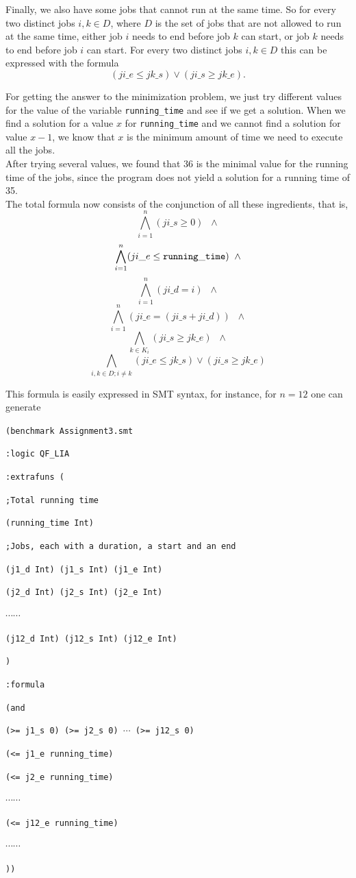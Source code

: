 \documentclass[a4paper]{article}
\begin{document}
	Finally, we also have some jobs that cannot run at the same time. So for every two distinct jobs $i,k \in D$, where $D$ is the set of jobs that are not allowed to run at the same time, either job $i$ needs to end before job $k$ can start, or job $k$ needs to end before job $i$ can start. For every two distinct jobs $i,k \in D$ this can be expressed with the formula
\[ (ji\_e \leq jk\_s) \vee (ji\_s \geq jk\_e).\]
	
For getting the answer to the minimization problem, we just try different values for the value of the variable {\tt running\_time} and see if we get a solution. When we find a solution for a value $x$ for {\tt running\_time} and we cannot find a solution for value $x-1$, we know that $x$ is the minimum amount of time we need to execute all the jobs.\\

After trying several values, we found that 36 is the minimal value for the running time of the jobs, since the program does not yield a solution for a running time of 35.\\

The total formula now consists of the conjunction of all these ingredients, that is,
\[ \bigwedge_{i=1}^n (ji\_s \geq 0) \;\; \wedge \]
\[ \bigwedge_{i=1}^n (ji\_e \leq {\tt running\_time}) \;\; \wedge \]
\[ \bigwedge_{i=1}^n (ji\_d = i) \;\; \wedge \]
\[ \bigwedge_{i=1}^n (ji\_e = (ji\_s + ji\_d)) \;\; \wedge \]
\[ \bigwedge_{k \in K_i} (ji\_s \geq jk\_e) \;\; \wedge \]
\[ \bigwedge_{i,k \in D; i \neq k} (ji\_e \leq jk\_s) \vee (ji\_s \geq jk\_e) \]


This formula is easily expressed in SMT syntax, for instance, for $n=12$ one can generate

{\footnotesize

{\tt (benchmark Assignment3.smt}

{\tt :logic QF\_LIA}

{\tt :extrafuns (}

{\tt ;Total running time }

{\tt (running\_time Int) }

{\tt ;Jobs, each with a duration, a start and an end }

{\tt (j1\_d Int) (j1\_s Int) (j1\_e Int) }
 
{\tt (j2\_d Int) (j2\_s Int) (j2\_e Int) }
 
$\cdots \cdots$
 
{\tt (j12\_d Int) (j12\_s Int) (j12\_e Int) }

{\tt )}

{\tt :formula}

{\tt   (and}

{\tt (>= j1\_s 0) (>= j2\_s 0) $\cdots$ (>= j12\_s 0) }

{\tt (<= j1\_e running\_time) }

{\tt (<= j2\_e running\_time) }

$\cdots \cdots$

{\tt (<= j12\_e running\_time) }

$\cdots \cdots$

{\tt )) }
}
\end{document}
